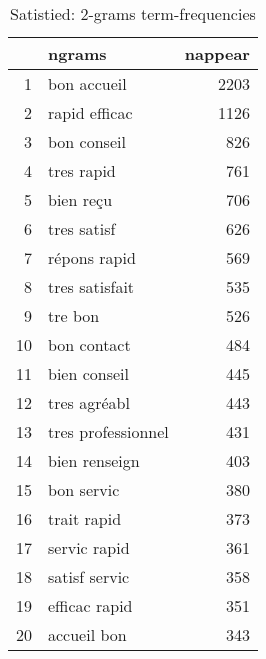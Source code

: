 \begin{table}[ht]
\centering
\begin{tabular}{rlr}
  \hline
 & ngrams & nappear \\ 
  \hline
1 & bon accueil & 2203 \\ 
  2 & rapid efficac & 1126 \\ 
  3 & bon conseil & 826 \\ 
  4 & tres rapid & 761 \\ 
  5 & bien reçu & 706 \\ 
  6 & tres satisf & 626 \\ 
  7 & répons rapid & 569 \\ 
  8 & tres satisfait & 535 \\ 
  9 & tre bon & 526 \\ 
  10 & bon contact & 484 \\ 
  11 & bien conseil & 445 \\ 
  12 & tres agréabl & 443 \\ 
  13 & tres professionnel & 431 \\ 
  14 & bien renseign & 403 \\ 
  15 & bon servic & 380 \\ 
  16 & trait rapid & 373 \\ 
  17 & servic rapid & 361 \\ 
  18 & satisf servic & 358 \\ 
  19 & efficac rapid & 351 \\ 
  20 & accueil bon & 343 \\ 
   \hline
\end{tabular}
\caption{Satistied: 2-grams term-frequencies} 
\label{tab:tf_sup_2}
\end{table}
